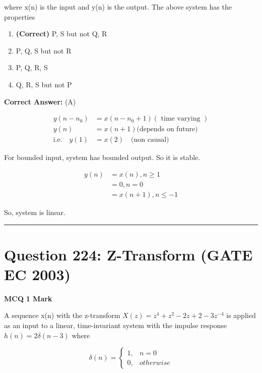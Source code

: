 \documentclass[11pt,a4paper]{article}
\begin{document}
where x(n) is the input and y(n) is the output. The above system has the properties


\begin{enumerate}[label=(\Alph*)]
    \item \textbf{(Correct)} P, S but not Q, R
    \item P, Q, S but not R
    \item P, Q, R, S
    \item Q, R, S but not P
\end{enumerate}

\noindent \textbf{Correct Answer:} (A)

\begin{tcolorbox}[solbox, title=Detailed Solution -- Question 223]
\[
\begin{aligned} y\left(n-n_{0}\right)&=x\left(n-n_{0}+1\right)(\text { time varying })\\ y(n)&=x(n+1) \text{(depends on future)} \\ \text{i.e.}\quad y(1)&=x(2) \quad \text{(non causal) } \end{aligned}
\]

 For bounded input, system has bounded output. So it is stable.

\[
\begin{aligned} y(n) &=x(n), n \geq 1 \\ &=0, n=0 \\ &=x(n+1), n \leq-1 \end{aligned}
\]

 So, system is linear.
\end{tcolorbox}

\vspace{1.5em}
\hrule
\vspace{1.5em}

\section*{Question 224: Z-Transform (GATE EC 2003)}
\noindent \textbf{\color{primary}MCQ} \hfill \textbf{\color{secondary}1 Mark}


\noindent A sequence x(n) with the z-transform $X(z) = z^{4}+z^{2}-2z+2-3z^{-4}$ is applied as an input to a linear, time-invariant system with the impulse response $h(n) =2 \delta (n - 3)$ where 
   
\[
\delta (n)=\left\{\begin{matrix} 1, &n=0 \\ 0, &otherwise \end{matrix}\right.
\]
                     
\end{document}
